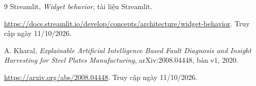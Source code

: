 \documentclass[12pt,a4paper,oneside]{report}
\begin{document}
\begin{thebibliography}{9}
  Streamlit,
  \textit{Widget behavior}, tài liệu Streamlit.
  \par\noindent
  \url{https://docs.streamlit.io/develop/concepts/architecture/widget-behavior}.\space
  Truy cập ngày 11/10/2026.

  A. Kharal,
  \textit{Explainable Artificial Intelligence Based Fault Diagnosis and Insight Harvesting for Steel Plates Manufacturing},
  arXiv:2008.04448, bản v1, 2020.
  \par\noindent
  \url{https://arxiv.org/abs/2008.04448}.
  Truy cập ngày 11/10/2026.
\end{thebibliography}
\end{document}
